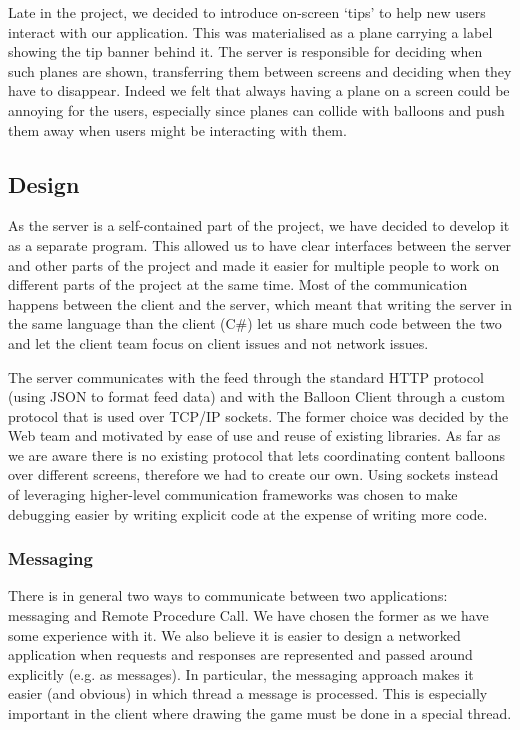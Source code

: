 Late in the project, we decided to introduce on-screen `tips' to help new users
interact with our application. This was materialised as a plane carrying a label
showing the tip banner behind it. The server is responsible for deciding when 
such planes are shown, transferring them between screens and deciding when they
have to disappear. Indeed we felt that always having a plane on a screen could
be annoying for the users, especially since planes can collide with balloons 
and push them away when users might be interacting with them.

\clearpage{}
\subsection{Design}

As the server is a self-contained part of the project, we have decided to 
develop it as a separate program. This allowed us to have clear interfaces 
between the server and other parts of the project and made it easier for
multiple people to work on different parts of the project at the same time.
Most of the communication happens between the client and the server, which 
meant that writing the server in the same language than the client (C\#) let us 
share much code between the two and let the client team focus on client issues 
and not network issues.

The server communicates with the feed through the standard HTTP protocol 
(using JSON to format feed data) and with the Balloon Client through a custom 
protocol that is used over TCP/IP sockets. The former choice was decided by the 
Web team and motivated by ease of use and reuse of existing libraries. As far 
as we are aware there is no existing protocol that lets coordinating content
balloons over different screens, therefore we had to create our own. Using 
sockets instead of leveraging higher-level communication frameworks was chosen 
to make debugging easier by writing explicit code at the expense of writing 
more code.

\subsubsection{Messaging}

There is in general two ways to communicate between two applications: messaging 
and Remote Procedure Call. We have chosen the former as we have some experience 
with it. We also believe it is easier to design a networked application when 
requests and responses are represented and passed around explicitly (e.g. as 
messages). In particular, the messaging approach makes it easier (and obvious) 
in which thread a message is processed. This is especially important in the 
client where drawing the game must be done in a special thread.

